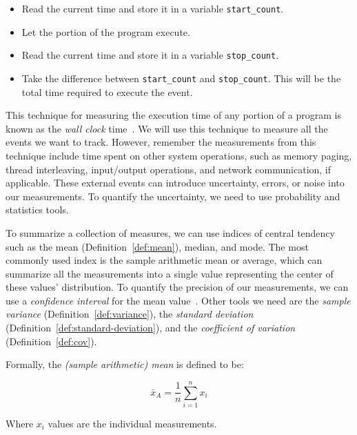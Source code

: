 \begin{itemize}
\item Read the current time and store it in a variable \texttt{start\_count}.
\item Let the portion of the program execute.
\item Read the current time and store it in a variable \texttt{stop\_count}.
\item Take the difference between \texttt{start\_count} and \texttt{stop\_count}. This will be the
total time required to execute the event.
\end{itemize}

This technique for measuring the execution time of any portion of a program
is known as the \emph{wall clock} time~\cite{lilja2005measuring}. We will use this technique to measure all the events we want to track. However, remember the measurements from this technique include time spent on other system operations, such as memory paging, thread interleaving, input/output operations, and network communication, if applicable. These external events can introduce uncertainty, errors, or noise into our measurements. To quantify the uncertainty, we need to use probability and statistics tools.

To summarize a collection of measures, we can use indices of central tendency such as the mean (Definition~\ref{def:mean}), median, and mode. The most commonly used index is the sample arithmetic mean or average, which can summarize all the measurements into a single value representing the center of these values' distribution. To quantify the precision of our measurements, we can use a \emph{confidence interval} for the mean value~\cite{DBLP_conf_oopsla_GeorgesBE07, lilja2005measuring}. Other tools we need are the \emph{sample variance} (Definition~\ref{def:variance}), the \emph{standard deviation} (Definition~\ref{def:standard-deviation}), and the \emph{coefficient of variation} (Definition~\ref{def:cov}).

\begin{definition}
Formally, the \emph{(sample arithmetic) mean} is defined to be:

\begin{equation}\label{eq:mean}
\bar{x}_A = \frac{1}{n}\sum^n_{i = 1}x_i
\end{equation}

\noindent Where \(x_i\) values are the individual measurements.
\end{definition}


